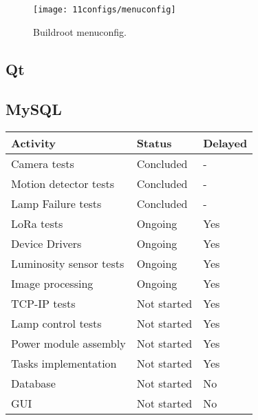 \begin{figure}[H]
	\centering	
	\texttt{[image: 11configs/menuconfig]}
	\caption{Buildroot menuconfig.}
	\label{fig:menuconfig}
\end{figure}

\subsection{Qt}

\subsection{MySQL}

\begin{table}[H]
	\centering
	\begin{tabular}{|m{8cm}|m{}|m{2cm}|}
		\hline
		\textbf{Activity} & \textbf{Status} & \textbf{Delayed}
		\\\hline\hline
		Camera tests & Concluded & -\\\hline
		Motion detector tests & Concluded & -\\\hline
		Lamp Failure tests & Concluded & -\\\hline
		
		LoRa tests & Ongoing & Yes\\\hline
		Device Drivers & Ongoing & Yes\\\hline
		Luminosity sensor tests & Ongoing & Yes\\\hline
		Image processing & Ongoing & Yes\\\hline
		
		TCP-IP tests & Not started & Yes\\\hline
		Lamp control tests & Not started & Yes\\\hline		
		Power module assembly & Not started & Yes\\\hline
		
		Tasks implementation & Not started & Yes\\\hline
		
		Database & Not started & No\\\hline
		GUI & Not started & No		
		\\\hline
	\end{tabular}
	
\end{table}



